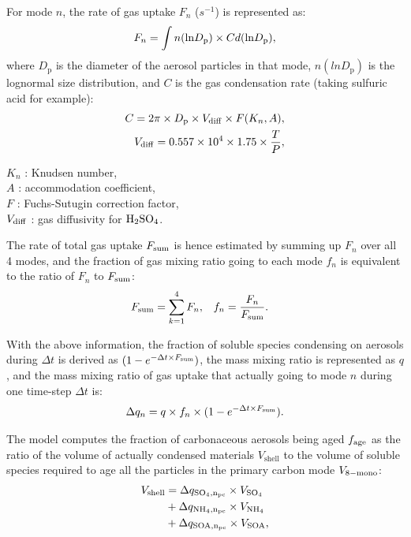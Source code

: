\documentclass[12pt, fullpage]{uiucthesis2009_2}
\begin{document}
	For mode $n$, the rate of gas uptake $F_{n}$ ($s^{-1}$) is represented as:
	\begin{equation}
	F_{n} = \int n(\text{ln}D_{\rm{p}})\times C d(\text{ln}D_\text{p}) ,
	\end{equation}
	where $D_\text{p}$ is the diameter of the aerosol particles in that mode, $n(lnD_\text{p})$ is the lognormal size distribution, and $C$ is the gas condensation rate (taking sulfuric acid for example):
	\begin{align}
	C = 2\pi \times D_\text{p} \times V_{\rm{diff}} \times F(K_{n}, A) ,\\
	V_{\rm{diff}} = 0.557 \times 10^4 \times 1.75 \times \frac{T}{P}, 
	\end{align}
	
	
	\begin{flushleft}
		$K_{n}$ : Knudsen number, \\
		$A$ : accommodation coefficient, \\
		$F$ : Fuchs-Sutugin correction factor, \\
		$V_{\rm{diff}}$ : gas diffusivity for  $\rm{H_2SO_4}$.
	\end{flushleft}
	The rate of total gas uptake $F_{\rm{sum}}$ is hence estimated by summing up $F_{n}$ over all 4 modes, and the fraction of gas mixing ratio going to each mode $f_{n}$ is equivalent to the ratio of $F_{n}$ to $F_{\rm{sum}}$:
	\begin{align}
	F_{\rm{sum}}  &= \sum_{k=1}^4 F_{n},         &
	f_{n}          &= \frac{F_{n}}{F_{\rm{sum}}}. 
	\end{align}
	
	With the above information, the fraction of soluble species condensing on aerosols during $\Delta t$ is derived as $(1 - e^{-\Delta t\times F_{\rm{sum}}})$, the mass mixing ratio is represented as $q$, and the mass mixing ratio of gas uptake that actually going to mode $n$ during one time-step $\Delta t$ is:
	\begin{equation}
	\Delta q_{n} = q \times f_{n} \times (1 - e^{-\Delta t\times F_ {\rm{sum}}}).
	\end{equation}
	
	The model computes the fraction of carbonaceous aerosols being aged $f_{\rm{age}}$ as the ratio of the volume of actually condensed materials $V_\text{shell}$ to the volume of soluble species required to age all the particles in the primary carbon mode $V_{\rm{8-mono}}$:
	\begin{align}
	\begin{split}
	V_{\rm{shell}} &=  \Delta q_{\rm{SO_4}, n_{\rm{pc}}} \times V_{\rm{SO_4}} \\
	&+ \Delta q_{\rm{NH_4}, n_{\rm{pc}}} \times V_{\rm{NH_4}} \\
	&+ \Delta q_{\rm{SOA}, n_{\rm{pc}}} \times V_{\rm{SOA}}, 
	\end{split}
	\end{align}
	
\end{document}
